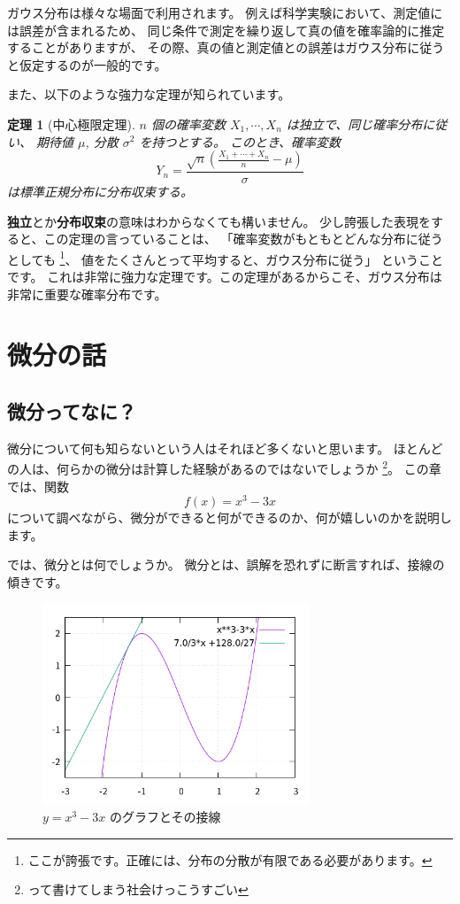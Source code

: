 \documentclass[uplatex,dvipdfmx]{jsarticle}
\newtheorem{thm}{定理}
\begin{document}
  ガウス分布は様々な場面で利用されます。
  例えば科学実験において、測定値には誤差が含まれるため、
  同じ条件で測定を繰り返して真の値を確率論的に推定することがありますが、
  その際、真の値と測定値との誤差はガウス分布に従うと仮定するのが一般的です。

  また、以下のような強力な定理が知られています。
  \begin{thm}[中心極限定理]
    $n$ 個の確率変数 $X_1, \cdots, X_n$ は独立で、同じ確率分布に従い、
    期待値 $\mu$, 分散 $\sigma^2$ を持つとする。
    このとき、確率変数
    \[
      Y_n = \frac{\sqrt{n}(\frac{X_1 + \cdots + X_n}{n} - \mu)}{\sigma}
    \]
    は標準正規分布に分布収束する。
  \end{thm}
  \textbf{独立}とか\textbf{分布収束}の意味はわからなくても構いません。
  少し誇張した表現をすると、この定理の言っていることは、
  「確率変数がもともとどんな分布に従うとしても
  \footnote{ここが誇張です。正確には、分布の分散が有限である必要があります。}、
  値をたくさんとって平均すると、ガウス分布に従う」
  ということです。
  これは非常に強力な定理です。この定理があるからこそ、ガウス分布は非常に重要な確率分布です。


\section{微分の話}
\subsection{微分ってなに？}
  微分について何も知らないという人はそれほど多くないと思います。
  ほとんどの人は、何らかの微分は計算した経験があるのではないでしょうか
  \footnote{って書けてしまう社会けっこうすごい}。
  この章では、関数
  \begin{equation}
    f(x) = x^3 - 3x
  \end{equation}
  について調べながら、微分ができると何ができるのか、何が嬉しいのかを説明します。

  では、微分とは何でしょうか。
  微分とは、誤解を恐れずに断言すれば、接線の傾きです。

  \begin{figure}
    \centering
    \includegraphics[width=8cm]{diff1.png}
    \caption{$y = x^3 -3x$ のグラフとその接線}
    \label{diff1}
  \end{figure}
\end{document}
